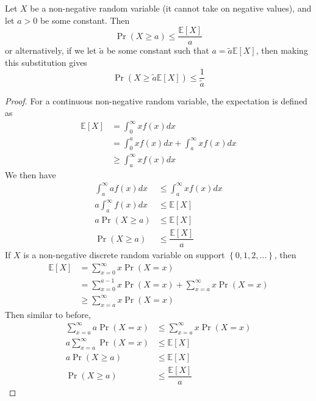 \documentclass[11pt]{report} %
\begin{document}
Let $X$ be a non-negative random variable (it cannot take on negative values), and let $a > 0$ be some constant. Then
\begin{equation}
\operatorname{Pr}\left(X\geq a\right) \leq \dfrac{\mathbb{E}\left[X\right]}{a}
\end{equation}
or alternatively, if we let $\tilde{a}$ be some constant such that $a = \tilde{a}\mathbb{E}\left[X\right]$, then making this substitution gives
\begin{equation}
\operatorname{Pr}\left(X\geq \tilde{a}\mathbb{E}\left[X\right]\right) \leq \dfrac{1}{\tilde{a}}
\end{equation}
\begin{proof}
For a continuous non-negative random variable, the expectation is defined as
\begin{align}
\mathbb{E}\left[X\right] &= \int_{0}^{\infty}xf\left(x\right)dx \\
&= \int_{0}^{a}xf\left(x\right)dx + \int_{a}^{\infty}xf\left(x\right)dx \\
&\geq \int_{a}^{\infty}xf\left(x\right)dx
\end{align}
We then have
\begin{align}
\int_{a}^{\infty}af\left(x\right)dx &\leq \int_{a}^{\infty}xf\left(x\right)dx \\
a\int_{a}^{\infty}f\left(x\right)dx &\leq \mathbb{E}\left[X\right] \\
a\operatorname{Pr}\left(X \geq a\right) &\leq \mathbb{E}\left[X\right] \\
\operatorname{Pr}\left(X \geq a\right) &\leq \dfrac{\mathbb{E}\left[X\right]}{a}
\end{align}
If $X$ is a non-negative discrete random variable on support $\left\{0, 1, 2, \dots\right\}$, then
\begin{align}
\mathbb{E}\left[X\right] &= \sum_{x = 0}^{\infty}x\operatorname{Pr}\left(X = x\right) \\
&= \sum_{x = 0}^{a - 1}x\operatorname{Pr}\left(X = x\right) + \sum_{x = a}^{\infty}x\operatorname{Pr}\left(X = x\right) \\
&\geq \sum_{x = a}^{\infty}x\operatorname{Pr}\left(X = x\right)
\end{align}
Then similar to before,
\begin{align}
\sum_{x = a}^{\infty}a\operatorname{Pr}\left(X = x\right) &\leq \sum_{x = a}^{\infty}x\operatorname{Pr}\left(X = x\right) \\
a\sum_{x = a}^{\infty}\operatorname{Pr}\left(X = x\right) &\leq \mathbb{E}\left[X\right] \\
a\operatorname{Pr}\left(X \geq a\right) &\leq \mathbb{E}\left[X\right] \\
\operatorname{Pr}\left(X \geq a\right) &\leq \dfrac{\mathbb{E}\left[X\right]}{a}
\end{align}
\end{proof}
\end{document}
